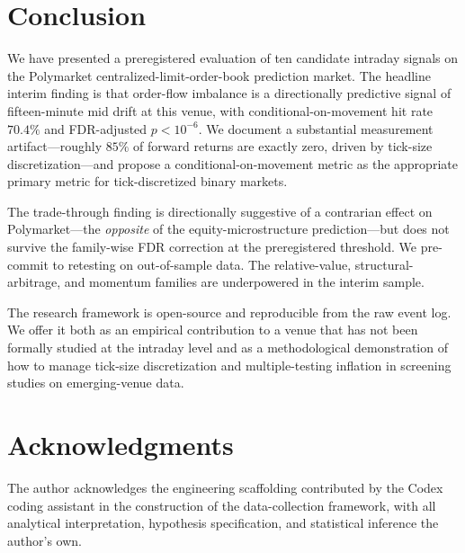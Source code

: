 \documentclass[review,12pt,authoryear]{elsarticle}
\begin{document}
\section{Conclusion}
\label{sec:conc}

We have presented a preregistered evaluation of ten candidate intraday
signals on the Polymarket centralized-limit-order-book prediction market.
The headline interim finding is that order-flow imbalance is a directionally
predictive signal of fifteen-minute mid drift at this venue, with
conditional-on-movement hit rate \(70.4\%\) and FDR-adjusted
\(p < 10^{-6}\). We document a substantial measurement artifact---roughly
\(85\%\) of forward returns are exactly zero, driven by tick-size
discretization---and propose a conditional-on-movement metric as the
appropriate primary metric for tick-discretized binary markets.

The trade-through finding is directionally suggestive of a contrarian
effect on Polymarket---the \emph{opposite} of the equity-microstructure
prediction---but does not survive the family-wise FDR correction at the
preregistered threshold. We pre-commit to retesting on out-of-sample data.
The relative-value, structural-arbitrage, and momentum families are
underpowered in the interim sample.

The research framework is open-source and reproducible from the raw event
log. We offer it both as an empirical contribution to a venue that has not
been formally studied at the intraday level and as a methodological
demonstration of how to manage tick-size discretization and multiple-testing
inflation in screening studies on emerging-venue data.

\section*{Acknowledgments}

The author acknowledges the engineering scaffolding contributed by the
Codex coding assistant in the construction of the data-collection
framework, with all analytical interpretation, hypothesis specification,
and statistical inference the author's own.



\end{document}
